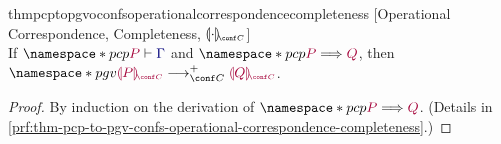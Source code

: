 \documentclass[main.tex]{subfiles}
\begin{document}
\begin{restatabletheorem}{thmpcptopgvoconfsoperationalcorrespondencecompleteness}%
  [Operational Correspondence, Completeness, $\cpgvC{\cdot}$]
  \label{thm:pcp-to-pgv-confs-operational-correspondence-completeness}
  \hfill\\%
  If $\pcp{\seq{P}{\ty{\Gamma}}}$ and $\pcp{\tm{P}\red\tm{Q}}$,
  then $\pgv{\tm{\cpgvC{P}}\cred^+\tm{\cpgvC{Q}}}$.
\end{restatabletheorem}
\begin{proof}
  By induction on the derivation of $\pcp{\tm{P}\red\tm{Q}}$.
  (Details in \cref{prf:thm-pcp-to-pgv-confs-operational-correspondence-completeness}.)
\end{proof}
\end{document}
